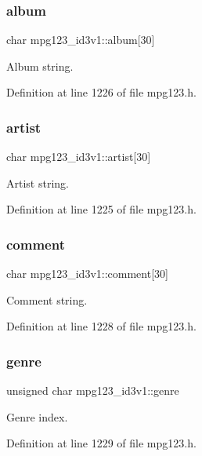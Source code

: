 \subsubsection{\texorpdfstring{album}{album}}
{\footnotesize\ttfamily char mpg123\+\_\+id3v1\+::album\mbox{[}30\mbox{]}}

Album string. 

Definition at line 1226 of file mpg123.\+h.

\mbox{\label{structmpg123__id3v1_a1aab043e91127fd288c379e974ffc8fe}} 
\subsubsection{\texorpdfstring{artist}{artist}}
{\footnotesize\ttfamily char mpg123\+\_\+id3v1\+::artist\mbox{[}30\mbox{]}}

Artist string. 

Definition at line 1225 of file mpg123.\+h.

\mbox{\label{structmpg123__id3v1_a32a423f6277d64b16b655eb115233e11}} 
\subsubsection{\texorpdfstring{comment}{comment}}
{\footnotesize\ttfamily char mpg123\+\_\+id3v1\+::comment\mbox{[}30\mbox{]}}

Comment string. 

Definition at line 1228 of file mpg123.\+h.

\mbox{\label{structmpg123__id3v1_ac7fa19ffcdc1fbb8d5fbf786606baa08}} 
\subsubsection{\texorpdfstring{genre}{genre}}
{\footnotesize\ttfamily unsigned char mpg123\+\_\+id3v1\+::genre}

Genre index. 

Definition at line 1229 of file mpg123.\+h.

\mbox{\label{structmpg123__id3v1_ab75ed435e357198b4316a0c86686069b}} 
